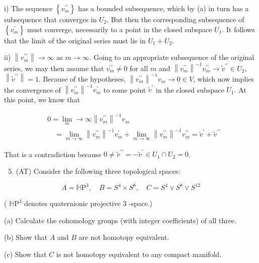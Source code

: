 \documentclass[10pt]{article}
\begin{document}
i) The sequence $\left\{v_{m}^{\prime \prime}\right\}$ has a bounded subsequence, which by (a) in turn has a subsequence that converges in $U_{2}$. But then the corresponding subsequence of $\left\{v_{m}^{\prime}\right\}$ must converge, necessarily to a point in the closed subspace $U_{1}$. It follows that the limit of the original series must lie in $U_{1}+U_{2}$.

ii) $\left\|v_{m}^{\prime \prime}\right\| \rightarrow \infty$ as $m \rightarrow \infty$. Going to an appropriate subsequence of the original series, we may then assume that $v_{m}^{\prime \prime} \neq 0$ for all $m$ and $\left\|v_{m}^{\prime \prime}\right\|^{-1} v_{m}^{\prime \prime} \rightarrow \tilde{v}^{\prime \prime} \in U_{2}$, $\left\|\tilde{v}^{\prime \prime}\right\|=1$. Because of the hypotheses, $\left\|v_{m}^{\prime \prime}\right\|^{-1} v_{m} \rightarrow 0 \in V$, which now implies the convergence of $\left\|v_{m}^{\prime \prime}\right\|^{-1} v_{m}^{\prime}$ to some point $\tilde{v}^{\prime}$ in the closed subspace $U_{1}$. At this point, we know that

$$
\begin{aligned}
& 0=\lim _{m} \rightarrow \infty\left\|v_{m}^{\prime \prime}\right\|^{-1} v_{m} \\
& \quad=\lim _{m \rightarrow \infty}\left\|v_{m}^{\prime \prime}\right\|^{-1} v_{m}^{\prime}+\lim _{m \rightarrow \infty}\left\|v_{m}^{\prime \prime}\right\|^{-1} v_{m}^{\prime \prime}=\tilde{v}^{\prime}+\tilde{v}^{\prime \prime}
\end{aligned}
$$

That is a contradiction because $0 \neq \tilde{v}^{\prime \prime}=-\tilde{v}^{\prime} \in U_{1} \cap U_{2}=0$.

\begin{enumerate}
  \setcounter{enumi}{4}
  \item (AT) Consider the following three topological spaces:
\end{enumerate}

$$
A=\mathbb{H} \mathrm{P}^{3}, \quad B=S^{4} \times S^{8}, \quad C=S^{4} \vee S^{8} \vee S^{12}
$$

( $\mathbb{H} \mathrm{P}^{3}$ denotes quaternionic projective 3 -space.)

(a) Calculate the cohomology groups (with integer coefficients) of all three.

(b) Show that $A$ and $B$ are not homotopy equivalent.

(c) Show that $C$ is not homotopy equivalent to any compact manifold.
\end{document}
